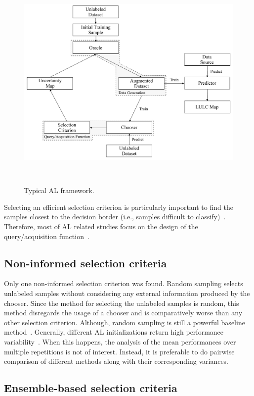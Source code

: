 \documentclass[parskip=full]{scrartcl}
\begin{document}
\begin{figure}[htb]
	\centering
	\includegraphics[width=.85\linewidth]{../analysis/al_typical}
	\caption{Typical AL framework.
    }~\label{fig:al_typical}
\end{figure}

Selecting an efficient selection criterion is particularly important to find the samples closest
to the decision border (i.e., samples difficult to classify)~\cite{Shrivastava2021}. Therefore, most
of AL related studies focus on the design of the query/acquisition function~\cite{Su2020}.

\subsection{Non-informed selection criteria}

Only one non-informed selection criterion was found. Random sampling selects unlabeled samples
without considering any external information produced by the chooser. Since the method for selecting
the unlabeled samples is random, this method disregards the usage of a chooser and is comparatively
worse than any other selection criterion. Although, random sampling is still a powerful baseline
method~\cite{Cawley2011}. Generally, different AL initializations return high performance
variability~\cite{Kottke2017}. When this happens, the analysis of the mean performances over multiple
repetitions is not of interest. Instead, it is preferable to do pairwise comparison of different
methods along with their corresponding variances. 

\subsection{Ensemble-based selection criteria}
\end{document}
